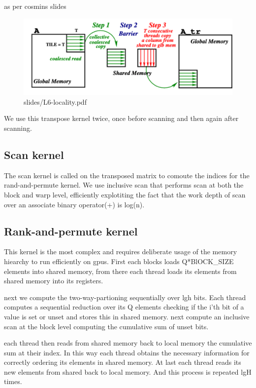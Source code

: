 \documentclass{article}
\begin{document}
as per cosmins slides
\begin{figure}
  \includegraphics[width=1\textwidth]{images/coalesced_transpose.png}
  \caption{slides/L6-locality.pdf}
\end{figure}


We use this transpose kernel twice, once before scanning and then again after scanning.

\subsection{Scan kernel}
The scan kernel is called on the transposed matrix to comoute the indices for the rand-and-permute kernel. 
We use inclusive scan that performs scan at both the block and warp level, efficiently explotiting the fact that the work depth of scan over an associate binary operator(+) is log(n).

\subsection{Rank-and-permute kernel}

This kernel is the most complex and requires deliberate usage of the memory hiearchy to run efficiently on gpus.
First each blocks loads Q*BlOCK\_SIZE elements into shared memory, from there each thread loads its elements from shared memory into its registers.

next we compute the two-way-partioning sequentially over lgh bits. 
Each thread computes a sequential reduction over its Q elements checking if the i'th bit of a value is set or unset and stores this in shared memory. 
next compute an inclusive scan at the block level computing the cumulative sum of unset bits. 

each thread then reads from shared memory back to local memory the cumulative sum at their index. 
In this way each thread obtains the necessary information for correctly ordering its elements in shared memory. 
At last each thread reads its new elements from shared back to local memory. And this process is repeated lgH times.
\end{document}
